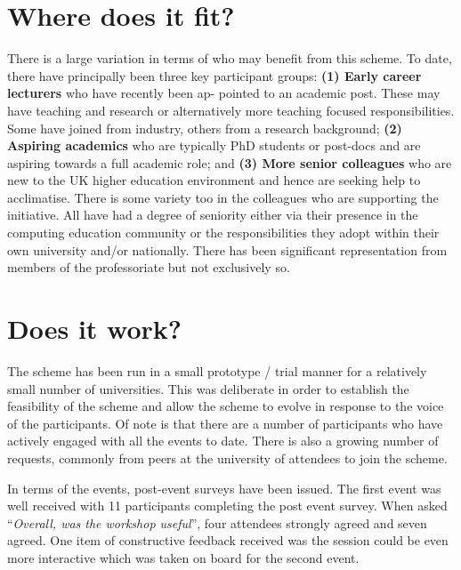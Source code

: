 \documentclass[sigconf]{acmart}
\begin{document}
\section{Where does it fit?}

There is a large variation in terms of who may benefit from this
scheme. To date, there have principally been three key participant
groups: \textbf{(1) Early career lecturers} who have recently been ap-
pointed to an academic post. These may have teaching and research or
alternatively more teaching focused responsibilities. Some have joined
from industry, others from a research background; \textbf{(2) Aspiring
academics }who are typically PhD students or post-docs and are
aspiring towards a full academic role; and \textbf{ (3) More senior
colleagues} who are new to the UK higher education environment and
hence are seeking help to acclimatise. There is some variety too in
the colleagues who are supporting the initiative. All have had a
degree of seniority either via their presence in the computing
education community or the responsibilities they adopt within their
own university and/or nationally. There has been significant
representation from members of the professoriate but not exclusively
so.

\section{Does it work?}	
\label{Sec:DoesItWork}
The scheme has been run in a small prototype / trial manner for a
relatively small number of universities. This was deliberate in order
to establish the feasibility of the scheme and allow the scheme to
evolve in response to the voice of the participants. Of note is that
there are a number of participants who have actively engaged with all
the events to date. There is also a growing number of requests,
commonly from peers at the university of attendees to join the scheme.

In terms of the events, post-event surveys have been issued. The first
event was well received with 11 participants completing the post event
survey. When asked ``{\emph{Overall, was the workshop useful}}'', four
attendees strongly agreed and seven agreed. One item of constructive
feedback received was the session could be even more interactive which
was taken on board for the second event.
\end{document}
